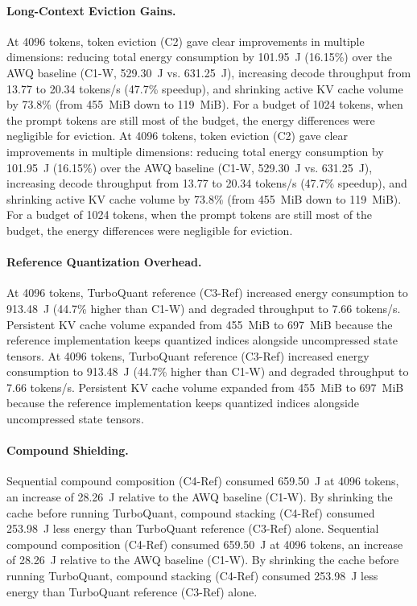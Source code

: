 \documentclass[sigconf,nonacm]{acmart}
\begin{document}
\paragraph{Long-Context Eviction Gains.}
At 4096 tokens, token eviction (C2) gave clear improvements in multiple dimensions: reducing total energy consumption by 101.95~J (16.15\%) over the AWQ baseline (C1-W, 529.30~J vs. 631.25~J), increasing decode throughput from 13.77 to 20.34 tokens/s (47.7\% speedup), and shrinking active KV cache volume by 73.8\% (from 455~MiB down to 119~MiB). For a budget of 1024 tokens, when the prompt tokens are still most of the budget, the energy differences were negligible for eviction.
At 4096 tokens, token eviction (C2) gave clear improvements in multiple dimensions: reducing total energy consumption by 101.95~J (16.15\%) over the AWQ baseline (C1-W, 529.30~J vs. 631.25~J), increasing decode throughput from 13.77 to 20.34 tokens/s (47.7\% speedup), and shrinking active KV cache volume by 73.8\% (from 455~MiB down to 119~MiB). For a budget of 1024 tokens, when the prompt tokens are still most of the budget, the energy differences were negligible for eviction.

\paragraph{Reference Quantization Overhead.}
At 4096 tokens, TurboQuant reference (C3-Ref) increased energy consumption to 913.48~J (44.7\% higher than C1-W) and degraded throughput to 7.66 tokens/s. Persistent KV cache volume expanded from 455~MiB to 697~MiB because the reference implementation keeps quantized indices alongside uncompressed state tensors.
At 4096 tokens, TurboQuant reference (C3-Ref) increased energy consumption to 913.48~J (44.7\% higher than C1-W) and degraded throughput to 7.66 tokens/s. Persistent KV cache volume expanded from 455~MiB to 697~MiB because the reference implementation keeps quantized indices alongside uncompressed state tensors.

\paragraph{Compound Shielding.}
Sequential compound composition (C4-Ref) consumed 659.50~J at 4096 tokens, an increase of 28.26~J relative to the AWQ baseline (C1-W). By shrinking the cache before running TurboQuant, compound stacking (C4-Ref) consumed 253.98~J less energy than TurboQuant reference (C3-Ref) alone.
Sequential compound composition (C4-Ref) consumed 659.50~J at 4096 tokens, an increase of 28.26~J relative to the AWQ baseline (C1-W). By shrinking the cache before running TurboQuant, compound stacking (C4-Ref) consumed 253.98~J less energy than TurboQuant reference (C3-Ref) alone.
\end{document}
